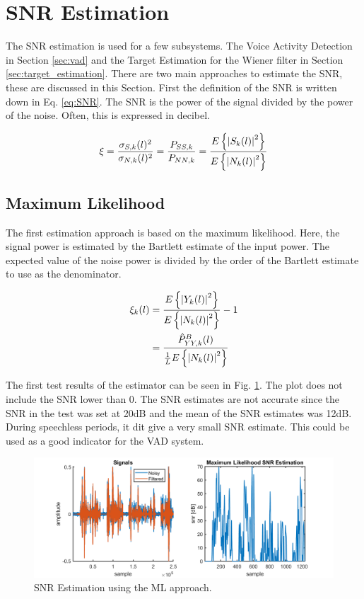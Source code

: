 \section{SNR Estimation} \label{sec:snr_estimation}
The SNR estimation is used for a few subsystems. The Voice Activity Detection in Section \ref{sec:vad} and the Target Estimation for the Wiener filter in Section \ref{sec:target_estimation}. There are two main approaches to estimate the SNR, these are discussed in this Section.
First the definition of the SNR is written down in Eq. \ref{eq:SNR}. The SNR is the power of the signal divided by the power of the noise. Often, this is expressed in decibel.

\begin{equation}
  \xi = \frac{\sigma_{S,k}(l)^{2}}{\sigma_{N,k}(l)^{2}} =
  \frac{P_{SS,k}}{P_{NN,k}} =
  \frac{E\left\{\abs{S_{k}(l)}^{2}\right\}}{E\left\{\abs{N_{k}(l)}^{2}\right\}}
  \label{eq:SNR}
\end{equation}

\subsection{Maximum Likelihood}
The first estimation approach is based on the maximum likelihood. Here, the signal power is estimated by the Bartlett estimate of the input power. The expected value of the noise power is divided by the order of the Bartlett estimate to use as the denominator.

\begin{align}
  \xi_{k}(l) &= \frac{E\left\{\abs{Y_{k}(l)}^{2}\right\}}{E\left\{\abs{N_{k}(l)}^{2}\right\}} - 1
  \label{eq:ML1}\\
  &= \frac{\hat P_{YY,k}^{B}(l)}{\frac{1}{L}E\left\{\abs{N_{k}(l)}^{2}\right\}}
  \label{eq:M2}
\end{align}

The first test results of the estimator can be seen in Fig. \ref{fig:mlsnr}. The plot does not include the SNR lower than 0. The SNR estimates are not accurate since the SNR in the test was set at 20dB and the mean of the SNR estimates was 12dB. During speechless periods, it dit give a very small SNR estimate. This could be used as a good indicator for the VAD system.

\begin{figure}[h]
  \centering
  \includegraphics[width=\textwidth]{images/mlsnr.png}
  \caption{SNR Estimation using the ML approach.}
  \label{fig:mlsnr}
\end{figure}

